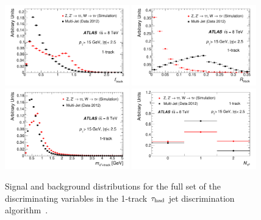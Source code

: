 \begin{figure}[tp]
  \includegraphics[width=0.48\textwidth]{figures/PERF-2013-06/figaux_03}
  \includegraphics[width=0.48\textwidth]{figures/PERF-2013-06/figaux_04}
  \includegraphics[width=0.48\textwidth]{figures/PERF-2013-06/figaux_05}
  \includegraphics[width=0.48\textwidth]{figures/PERF-2013-06/figaux_06}
  \caption{Signal and background distributions for the full set of the discriminating variables in the 1-track $\tau_\text{had}$ jet discrimination algorithm~\cite{PERF-2013-06}.}
  \label{fig:tauid-inputs-1p}
\end{figure}

